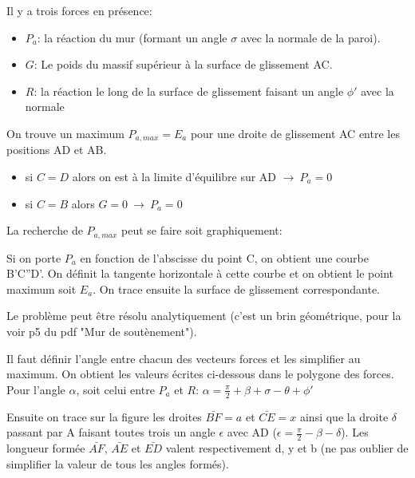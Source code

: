         Il y a trois forces en présence:
        \begin{itemize}
            \item $P_a$: la réaction du mur (formant un angle $\sigma$ avec la normale de la paroi).
            \item $G$: Le poids du massif supérieur à la surface de glissement AC.
            \item $R$: la réaction le long de la surface de glissement faisant un angle $\phi'$ avec la normale
        \end{itemize} 
        
        On trouve un maximum $P_{a,max} = E_a$ pour une droite de glissement AC entre les positions AD et AB.
        \begin{itemize}
            \item si $C=D$ alors on est à la limite d'équilibre sur AD $\to \: P_a=0$
            \item si $C=B$ alors $G=0 \: \to \: P_a = 0$
        \end{itemize} 
        
        La recherche de $P_{a,max}$ peut se faire soit graphiquement:
        
        Si on porte $P_a$ en fonction de l'abscisse du point C, on obtient une courbe B'C''D'. On définit la tangente horizontale à cette courbe et on obtient le point maximum soit $E_a$. On trace ensuite la surface de glissement correspondante. 
        
        Le problème peut être résolu analytiquement (c'est un brin géométrique, pour la voir p5 du pdf "Mur de soutènement"). 
        
        Il faut définir l'angle entre chacun des vecteurs forces et les simplifier au maximum. On obtient les valeurs écrites ci-dessous dans le polygone des forces. Pour l'angle $\alpha$, soit celui entre $P_a$ et $R$: $\alpha = \frac{\pi}{2} + \beta + \sigma - \theta + \phi'$ 
        
        Ensuite on trace sur la figure les droites $\bar{BF} = a$ et $\bar{CE} = x$ ainsi que la droite $\delta$ passant par A faisant toutes trois un angle $\epsilon$ avec AD ($\epsilon = \frac{\pi}{2} - \beta - \delta$). Les longueur formée $\bar{AF}$, $\bar{AE}$ et $\bar{ED}$ valent respectivement d, y et b (ne pas oublier de simplifier la valeur de tous les angles formés). 
        
